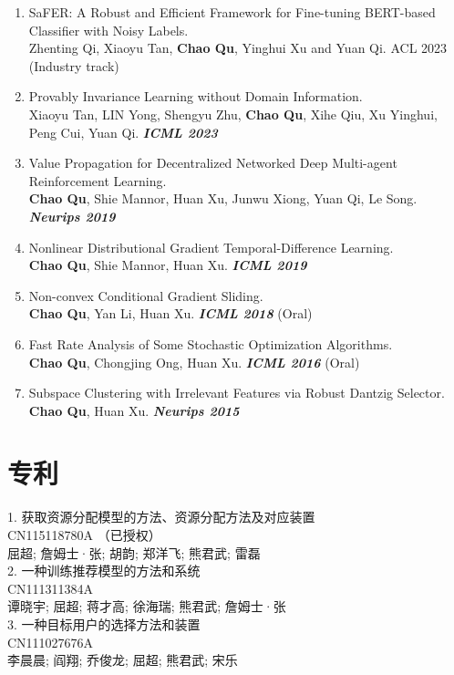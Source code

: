 \documentclass{resume}
\begin{document}
\begin{enumerate}
    \item SaFER: A Robust and Efficient Framework for Fine-tuning BERT-based Classifier with Noisy Labels. \\ Zhenting Qi, Xiaoyu Tan, \textbf{Chao Qu}, Yinghui Xu and Yuan Qi. ACL 2023 (Industry track)
    \item Provably Invariance Learning without Domain Information. \\  Xiaoyu Tan, LIN Yong, Shengyu Zhu, \textbf{Chao Qu}, Xihe Qiu, Xu Yinghui, Peng Cui, Yuan Qi. \textbf{\textit{ICML 2023}}


    \item Value Propagation for Decentralized Networked Deep Multi-agent Reinforcement Learning. \\ \textbf{Chao Qu}, Shie Mannor, Huan Xu, Junwu Xiong, Yuan Qi, Le Song. \textbf{\textit{Neurips 2019}} 
    \item Nonlinear Distributional Gradient Temporal-Difference Learning. \\ \textbf{Chao Qu}, Shie Mannor, Huan Xu. \textbf{\textit{ICML  2019}}
    \item Non-convex Conditional Gradient Sliding. \\ \textbf{Chao Qu}, Yan Li, Huan Xu. \textbf{\textit{ICML 2018}} {\color{red}(Oral)}
    \item Fast Rate Analysis of Some Stochastic Optimization Algorithms. \\ \textbf{Chao Qu}, Chongjing Ong, Huan Xu. \textbf{\textit{ICML  2016}} {\color{red}(Oral)}
    \item Subspace Clustering with Irrelevant Features via Robust Dantzig Selector. \\ \textbf{Chao Qu}, Huan Xu. \textbf{\textit{Neurips 2015}} 
\end{enumerate}
\small


\section{专利}

1. 获取资源分配模型的方法、资源分配方法及对应装置 \\
CN115118780A （已授权） \\
屈超; 詹姆士·张; 胡韵; 郑洋飞; 熊君武; 雷磊\\
2. 一种训练推荐模型的方法和系统 \\
CN111311384A \\
谭晓宇; 屈超; 蒋才高; 徐海瑞; 熊君武; 詹姆士·张\\
3. 一种目标用户的选择方法和装置\\
CN111027676A\\
李晨晨; 阎翔; 乔俊龙; 屈超; 熊君武; 宋乐
\end{document}
